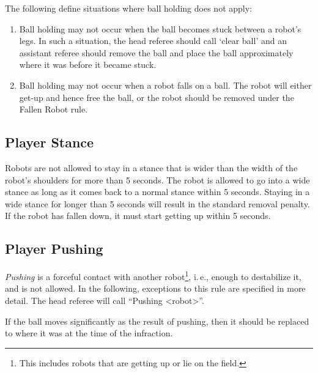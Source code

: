 \documentclass[12pt]{article}
\newcommand{\ie}{\mbox{i.\,e.}\xspace}
\begin{document}
The following define situations where ball holding does not apply:

\begin{enumerate}
\item Ball holding may not occur when the ball becomes stuck between a robot's legs.  In such a situation, the head referee should call `clear ball' and an assistant referee should remove the ball and place the ball approximately where it was before it became stuck.
\item Ball holding may not occur when a robot falls on a ball.  The robot will either get-up and hence free the ball, or the robot should be removed under the Fallen Robot rule. 
\end{enumerate}

\subsection{Player Stance}
\label{sec:player_stance}

Robots are not allowed to stay in a stance that is wider than the width of the robot's shoulders for more than 5 seconds. The robot is allowed to go into a wide stance as long as it comes back to a normal stance within 5 seconds. Staying in a wide stance for longer than 5 seconds will result in the standard removal penalty. If the robot has fallen down, it must start getting up within 5 seconds.

\subsection{Player Pushing}
\label{sec:player_pushing}

\emph{Pushing} is a forceful contact with another robot\footnote{This includes robots that are getting up or lie on the field.}, \ie, enough to destabilize it, and is not allowed. In the following, exceptions to this rule are specified in more detail.
The head referee will call ``Pushing \textless robot\textgreater''.

If the ball moves significantly as the result of pushing, then it should be replaced to where it was at the time of the infraction. 
\end{document}

